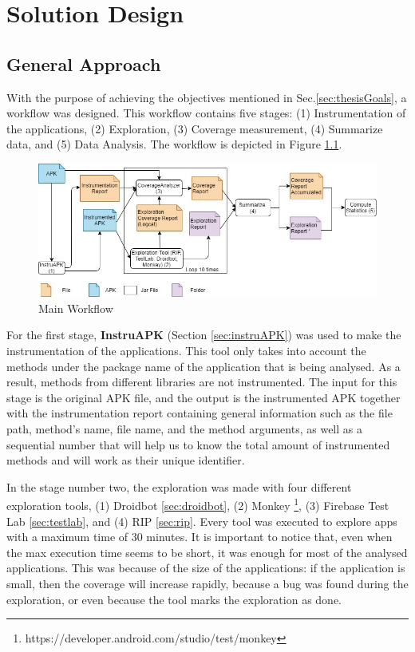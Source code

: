 \chapter{Solution Design} %
\label{Chapter3} %
\section{General Approach} \label{sec:generalApproach}

With the purpose of achieving the objectives mentioned in Sec.\ref{sec:thesisGoals}, a workflow was designed. This workflow contains five stages: (1) Instrumentation of the applications, (2) Exploration, (3) Coverage measurement, (4) Summarize data, and (5)  Data Analysis. The workflow is depicted in Figure \ref{fig:workflow}.

\begin{figure}[h]
\centering
\includegraphics[width=\textwidth]{../Figures/workflow.jpg}
\caption{Main Workflow}\label{fig:workflow}
\end{figure}

For the first stage, \textbf{InstruAPK} (Section \ref{sec:instruAPK}) was used to make the instrumentation of the applications. This tool only takes into account the methods under the package name of the application that is being analysed. As a result, methods from different libraries are not instrumented. The input for this stage is the original APK file, and the output is the instrumented APK together with the instrumentation report containing general information such as the file path, method's name, file name, and the method arguments, as well as a sequential number that will help us to know the total amount of instrumented methods and will work as their unique identifier.

In the stage number two, the exploration was made with four different exploration tools, (1) Droidbot \ref{sec:droidbot}, (2) Monkey \footnote{https://developer.android.com/studio/test/monkey}, (3) Firebase Test Lab \ref{sec:testlab}, and (4) RIP \ref{sec:rip}. Every tool was executed to explore  apps with a maximum time of 30 minutes. It is important to notice that, even when the max execution time seems to be short, it was enough for most of the analysed applications. This was because of the size of the applications: if the application is small, then the coverage will increase rapidly, because a bug was found during the exploration, or even because the tool marks the exploration as done. 

